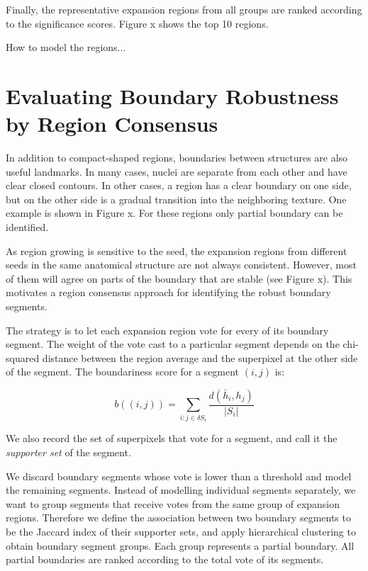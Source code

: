 \documentclass{llncs}
\newcommand{\authcmt}[2]{\textcolor{#1}{#2}}
\newcommand{\yoav}[1]{\authcmt{blue}{[YF: #1]}}
\begin{document}
Finally, the representative expansion regions from all groups are ranked according to the significance scores. Figure x shows the top 10 regions.

How to model the regions...

%
 
\section{Evaluating Boundary Robustness by Region Consensus}

In addition to compact-shaped regions, boundaries between structures are also useful landmarks. In many cases, nuclei are separate from each other and have clear closed contours. In other cases, a region has a clear boundary on one side, but on the other side is a gradual transition into the neighboring texture. One example is shown in Figure x. For these regions only partial boundary can be identified.

As region growing is sensitive to the seed, the expansion regions from different seeds in the same anatomical structure are not always consistent. However, most of them will agree on parts of the boundary that are stable (see Figure x). This motivates a region consensus approach for identifying the robust boundary segments.


The strategy is to let each expansion region vote for every of its boundary segment. The weight of the vote cast to a particular segment depends on the chi-squared distance between the region average and the superpixel at the other side of the segment. The boundariness score for a segment $(i,j)$ is:

$$
b((i,j)) = \sum_{i: j\in \delta S_i} \frac{d(\bar{h}_i, h_j)}{|S_i|}
$$

We also record the set of superpixels that vote for a segment, and call it the \textit{supporter set} of the segment.

We discard boundary segments whose vote is lower than a threshold and model the remaining segments. Instead of modelling individual segments separately, we want to group segments that receive votes from the same group of expansion regions. Therefore we define the association between two boundary segments to be the Jaccard index of their supporter sets, and apply hierarchical clustering to obtain boundary segment groups. Each group represents a partial boundary. All partial boundaries are ranked according to the total vote of its segments.
\end{document}
